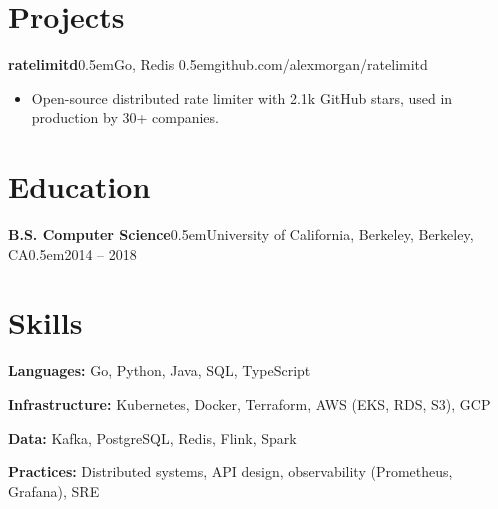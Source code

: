 \documentclass[10pt]{article}
\newcommand{\sep}{\unskip\kern0.5em{\color{subtle}\textbar}\hspace{0.5em}}
\newcommand{\project}[2]{{\bfseries #1}{\color{subtle}\sep #2}\par}
\newcommand{\degree}[4]{{\bfseries #1}\sep #3, #4{\color{subtle}\sep #2}\par}
\begin{document}
\section{Projects}
\project{ratelimitd}{Go, Redis \sep github.com/alexmorgan/ratelimitd}
\begin{itemize}
  \item Open-source distributed rate limiter with 2.1k GitHub stars, used in production by 30+ companies.
\end{itemize}

\section{Education}
\degree{B.S. Computer Science}{2014 -- 2018}{University of California, Berkeley}{Berkeley, CA}

\section{Skills}
\textbf{Languages:} Go, Python, Java, SQL, TypeScript\par
\textbf{Infrastructure:} Kubernetes, Docker, Terraform, AWS (EKS, RDS, S3), GCP\par
\textbf{Data:} Kafka, PostgreSQL, Redis, Flink, Spark\par
\textbf{Practices:} Distributed systems, API design, observability (Prometheus, Grafana), SRE
\end{document}
